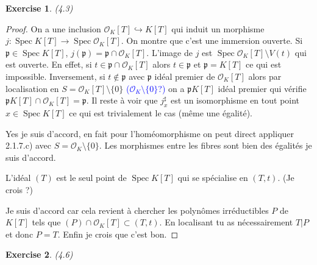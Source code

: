 \documentclass[A4, 11pt]{article}
\newtheorem{exer}{Exercise}
\def\Spec{ \operatorname{Spec}}
\begin{document}
\begin{exer}(4.3)
\end{exer}
\begin{proof}
On a une inclusion $\mathcal{O}_K[T] \hookrightarrow K[T]$ qui induit un morphisme 
$j\colon \Spec K[T] \rightarrow \Spec \mathcal{O}_K [T]$. On montre que c'est une immersion ouverte. Si $\mathfrak{p}\in \Spec K[T]$, $j(\mathfrak{p})=\mathfrak{p}\cap \mathcal{O}_K[T]$. L'image de $j$ est $\Spec \mathcal{O}_K[T] \setminus V(t)$ qui est ouverte. En effet, si $t\in \mathfrak{p}\cap \mathcal{O}_K[T]$ alors $t\in \mathfrak{p}$ et $\mathfrak{p}=K[T]$ ce qui est impossible. Inversement, si $t\notin \mathfrak{p}$ avec $\mathfrak{p}$ idéal premier de $\mathcal{O}_K[T]$ alors par localisation en $S=\mathcal{O}_K[T]\setminus \{0\}$ \textcolor{blue}{($\mathcal{O}_K\setminus \{0\}$?)} on a $\mathfrak{p}K[T]$ idéal premier qui vérifie $\mathfrak{p}K[T]\cap \mathcal{O}_K[T]=\mathfrak{p}$. Il reste à voir que $j^{\sharp}_x$ est un isomorphisme en tout point $x\in \Spec K[T]$ ce qui est trivialement le cas (même une égalité).

{\color{blue} Yes je suis d'accord, en fait pour l'homéomorphisme on peut direct appliquer 2.1.7.c) avec $S=\mathcal{O}_K\setminus \{0\}$. Les morphismes entre les fibres sont bien des égalités je suis d'accord.}

 L'idéal $(T)$ est le seul point de $\Spec K[T]$ qui se spécialise en $(T,t)$. (Je crois ?)
 
{\color{blue} Je suis d'accord car cela revient à chercher les polynômes irréductibles $P$ de $K[T]$ tels que $(P)\cap \mathcal{O}_K[T]\subset (T, t)$. En localisant tu as nécessairement $T| P$ et donc $P=T$. Enfin je crois que c'est bon.}
\end{proof}
\begin{exer}(4.6)
\end{exer}
\end{document}
